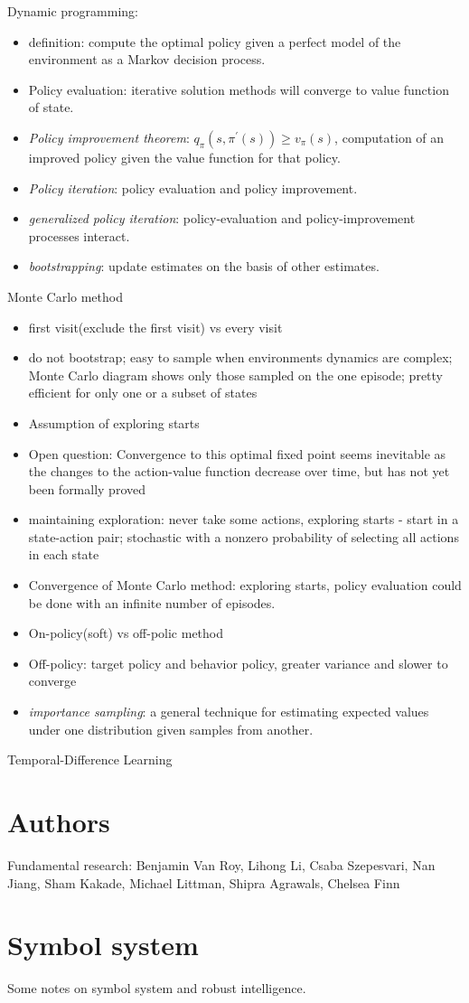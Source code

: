 \documentclass[12pt, letterpaper]{article}
\begin{document}
Dynamic programming:
\begin{itemize}
	\item definition: compute the optimal policy given a perfect model of the environment as a Markov decision process.
	\item Policy evaluation: iterative solution methods will converge to value function of state. 
	\item \textit{Policy improvement theorem}: $q_{\pi}(s, \pi^{\prime} (s)) \geq v_{\pi} (s)$, computation of an improved policy given the value function for that policy.
	\item \textit{Policy iteration}: policy evaluation and policy improvement.
	\item \textit{generalized policy iteration}: policy-evaluation and policy-improvement processes interact.
	\item \textit{bootstrapping}: update estimates on the basis of other estimates.
\end{itemize}

Monte Carlo method
\begin{itemize}
	\item first visit(exclude the first visit) vs every visit
	\item do not bootstrap; easy to sample when environments dynamics are complex; Monte Carlo diagram shows only those sampled on the one episode; pretty efficient for only
one or a subset of states
	\item Assumption of exploring starts
	\item Open question: Convergence to this optimal fixed point seems inevitable as the changes to the action-value function decrease over time, but has not yet been formally proved
	\item maintaining exploration: never take some actions, exploring starts - start in a state-action pair; stochastic with a nonzero probability of selecting all actions in each state
	\item Convergence of Monte Carlo method: exploring starts, policy evaluation could be done with an infinite number of episodes.
	\item On-policy(soft) vs off-polic method
	\item Off-policy: target policy and behavior policy, greater variance and slower to converge
	\item \textit{importance sampling}: a general technique for estimating expected values under one distribution given samples from another.
\end{itemize}

Temporal-Difference Learning

\section{Authors}
Fundamental research: Benjamin Van Roy, Lihong Li, Csaba Szepesvari, Nan Jiang, Sham Kakade, Michael Littman, Shipra Agrawals, Chelsea Finn

\section{Symbol system}
Some notes on symbol system and robust intelligence.
\end{document}
